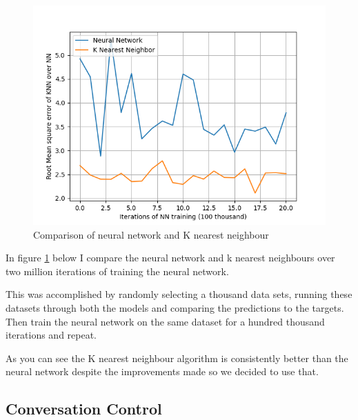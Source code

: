 \documentclass[11pt]{article}
\begin{document}
	\begin{figure}[!htb]
		\begin{center}
			\includegraphics[width=1.2\textwidth]{Resources/PartTwo/Comparison_20220112_152958.png}
			\caption{Comparison of neural network and K nearest neighbour}
			\label{Img:NNKNNComp}
		\end{center}
	\end{figure}
	
	In figure \ref{Img:NNKNNComp} below I compare the neural network and k nearest neighbours over two million iterations of training the neural network.
	
	This was accomplished by randomly selecting a thousand data sets, running these datasets through both the models and comparing the predictions to the targets. Then train the neural network on the same dataset for a hundred thousand iterations and repeat.
	
	As you can see the K nearest neighbour algorithm is consistently better than the neural network despite the improvements made so we decided to use that.		
	
	\subsection{Conversation Control}
	
	
\end{document}

